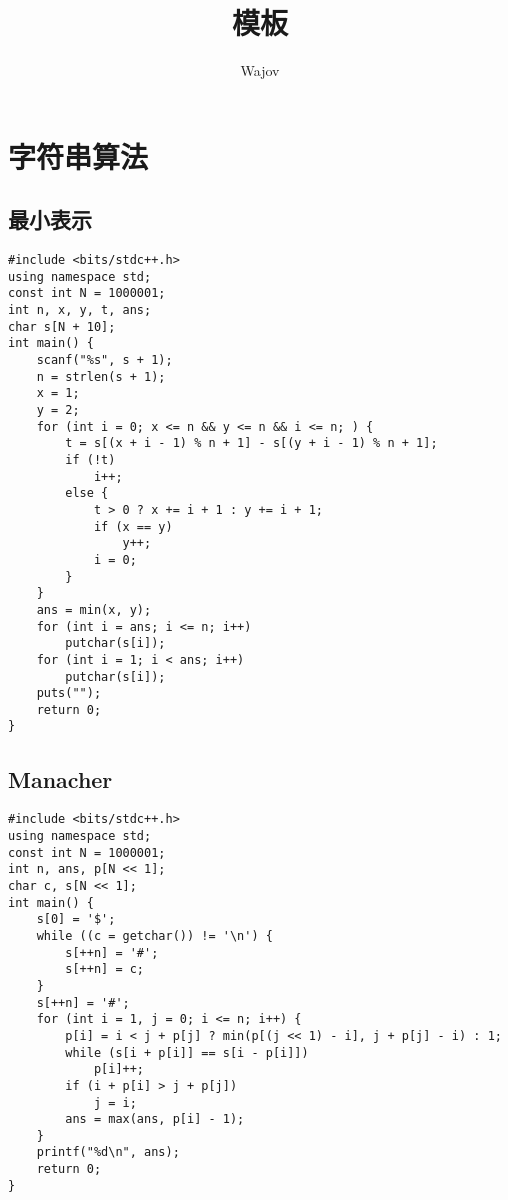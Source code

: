 \documentclass[a4paper]{article}
\title{模板}
\author{Wajov}
\begin{document}
\maketitle
\renewcommand{\contentsname}{目录}
\tableofcontents
\newpage
\newfontfamily{}
\section{字符串算法}
\subsection{最小表示}
\begin{lstlisting}
#include <bits/stdc++.h>
using namespace std;
const int N = 1000001;
int n, x, y, t, ans;
char s[N + 10];
int main() {
    scanf("%s", s + 1);
    n = strlen(s + 1);
    x = 1;
    y = 2;
    for (int i = 0; x <= n && y <= n && i <= n; ) {
        t = s[(x + i - 1) % n + 1] - s[(y + i - 1) % n + 1];
        if (!t)
            i++;
        else {
            t > 0 ? x += i + 1 : y += i + 1;
            if (x == y)
                y++;
            i = 0;
        }
    }
    ans = min(x, y);
    for (int i = ans; i <= n; i++)
        putchar(s[i]);
    for (int i = 1; i < ans; i++)
        putchar(s[i]);
    puts("");
    return 0;
}
\end{lstlisting}
\subsection{Manacher}
\begin{lstlisting}
#include <bits/stdc++.h>
using namespace std;
const int N = 1000001;
int n, ans, p[N << 1];
char c, s[N << 1];
int main() {
    s[0] = '$';
    while ((c = getchar()) != '\n') {
        s[++n] = '#';
        s[++n] = c;
    }
    s[++n] = '#';
    for (int i = 1, j = 0; i <= n; i++) {
        p[i] = i < j + p[j] ? min(p[(j << 1) - i], j + p[j] - i) : 1;
        while (s[i + p[i]] == s[i - p[i]])
            p[i]++;
        if (i + p[i] > j + p[j])
            j = i;
        ans = max(ans, p[i] - 1);
    }
    printf("%d\n", ans);
    return 0;
}
\end{lstlisting}
\end{document}
